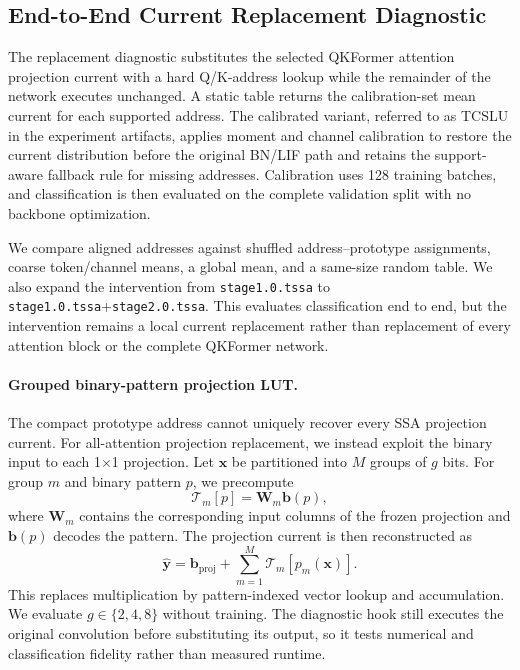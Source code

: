 \subsection{End-to-End Current Replacement Diagnostic}
\label{sec:e2}

The replacement diagnostic substitutes the selected QKFormer attention
projection current with a hard Q/K-address lookup while the remainder of the
network executes unchanged. A static table returns the calibration-set mean
current for each supported address. The calibrated variant, referred to as
TCSLU in the experiment artifacts, applies moment and channel calibration to
restore the current distribution before the original BN/LIF path and retains
the support-aware fallback rule for missing addresses. Calibration uses 128
training batches, and classification is then evaluated on the complete
validation split with no backbone optimization.

We compare aligned addresses against shuffled address--prototype assignments,
coarse token/channel means, a global mean, and a same-size random table. We
also expand the intervention from \texttt{stage1.0.tssa} to
\texttt{stage1.0.tssa}+\texttt{stage2.0.tssa}. This evaluates classification
end to end, but the intervention remains a local current replacement rather
than replacement of every attention block or the complete QKFormer network.

\paragraph{Grouped binary-pattern projection LUT.}
The compact prototype address cannot uniquely recover every SSA projection
current. For all-attention projection replacement, we instead exploit the
binary input to each 1$\times$1 projection. Let $\mathbf{x}$ be partitioned
into $M$ groups of $g$ bits. For group $m$ and binary pattern $p$, we
precompute
\begin{equation}
  \mathcal{T}_{m}[p] = \mathbf{W}_{m}\mathbf{b}(p),
\end{equation}
where $\mathbf{W}_{m}$ contains the corresponding input columns of the frozen
projection and $\mathbf{b}(p)$ decodes the pattern. The projection current is
then reconstructed as
\begin{equation}
  \hat{\mathbf{y}} =
  \mathbf{b}_{\mathrm{proj}} +
  \sum_{m=1}^{M}\mathcal{T}_{m}[p_m(\mathbf{x})].
\end{equation}
This replaces multiplication by pattern-indexed vector lookup and
accumulation. We evaluate $g\in\{2,4,8\}$ without training. The diagnostic hook
still executes the original convolution before substituting its output, so it
tests numerical and classification fidelity rather than measured runtime.

